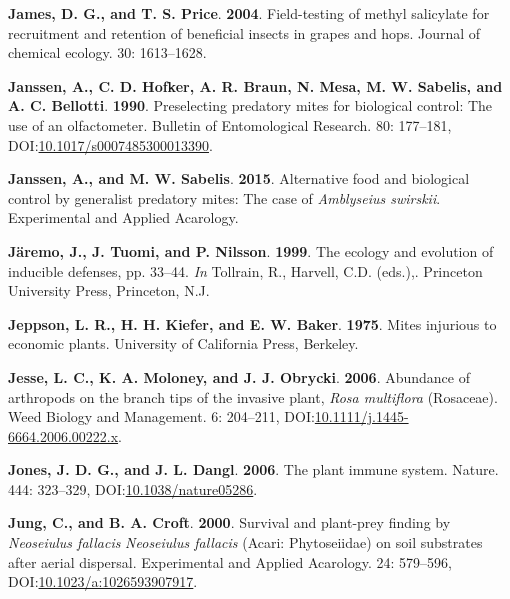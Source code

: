\documentclass[12pt,final,CPage]{ufthesis}
\newlength{\cslhangindent}
\newenvironment{CSLReferences}[2] %
{%
	\setlength{\parindent}{0pt}
	\ifodd #1 \everypar{\setlength{\hangindent}{\cslhangindent}}\ignorespaces\fi
	\ifnum #2 > 0
	\setlength{\parskip}{#2\baselineskip}
	\fi
}%
{}
\begin{document}
{\begin{CSLReferences}{1}{0}
  \leavevmode{}%
  \textbf{James, D. G., and T. S. Price}. \textbf{2004}. Field-testing of methyl salicylate for recruitment and retention of beneficial insects in grapes and hops. Journal of chemical ecology. 30: 1613--1628.

  \leavevmode{}%
  \textbf{Janssen, A., C. D. Hofker, A. R. Braun, N. Mesa, M. W. Sabelis, and A. C. Bellotti}. \textbf{1990}. Preselecting predatory mites for biological control: The use of an olfactometer. Bulletin of Entomological Research. 80: 177--181, DOI:\href{https://doi.org/10.1017/s0007485300013390}{10.1017/s0007485300013390}.

  \leavevmode{}%
  \textbf{Janssen, A., and M. W. Sabelis}. \textbf{2015}. Alternative food and biological control by generalist predatory mites: The case of {\emph{Amblyseius swirskii}}. Experimental and Applied Acarology.

  \leavevmode{}%
  \textbf{Järemo, J., J. Tuomi, and P. Nilsson}. \textbf{1999}. The ecology and evolution of inducible defenses, pp. 33--44. \emph{In} Tollrain, R., Harvell, C.D. (eds.),. Princeton University Press, Princeton, N.J.

  \leavevmode{}%
  \textbf{Jeppson, L. R., H. H. Kiefer, and E. W. Baker}. \textbf{1975}. Mites injurious to economic plants. University of California Press, Berkeley.

  \leavevmode{}%
  \textbf{Jesse, L. C., K. A. Moloney, and J. J. Obrycki}. \textbf{2006}. Abundance of arthropods on the branch tips of the invasive plant, {\emph{Rosa multiflora}} ({Rosaceae}). Weed Biology and Management. 6: 204--211, DOI:\href{https://doi.org/10.1111/j.1445-6664.2006.00222.x}{10.1111/j.1445-6664.2006.00222.x}.

  \leavevmode{}%
  \textbf{Jones, J. D. G., and J. L. Dangl}. \textbf{2006}. The plant immune system. Nature. 444: 323--329, DOI:\href{https://doi.org/10.1038/nature05286}{10.1038/nature05286}.

  \leavevmode{}%
  \textbf{Jung, C., and B. A. Croft}. \textbf{2000}. Survival and plant-prey finding by {\emph{Neoseiulus fallacis}} {\emph{Neoseiulus fallacis}} ({Acari}: {Phytoseiidae}) on soil substrates after aerial dispersal. Experimental and Applied Acarology. 24: 579--596, DOI:\href{https://doi.org/10.1023/a:1026593907917}{10.1023/a:1026593907917}.


\end{CSLReferences}}
\end{document}
